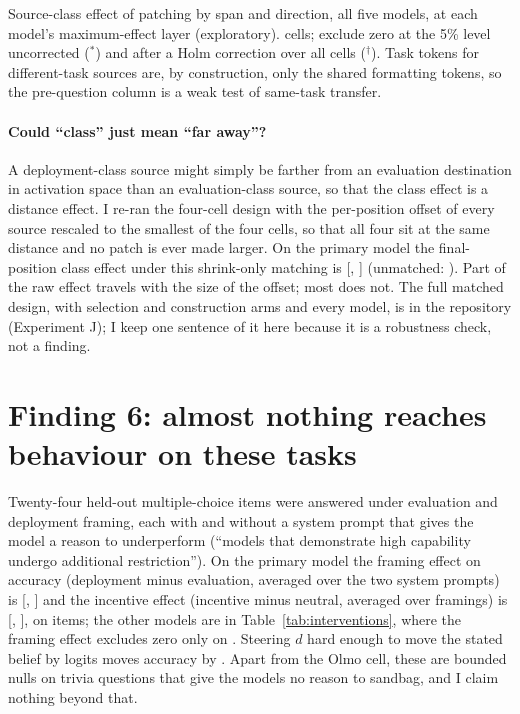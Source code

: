 \documentclass[10pt]{article}
\newcommand{\todo}[1]{\textcolor{red}{[TODO: #1]}}
\begin{document}
\begin{table}[t]\centering\footnotesize
\IfFileExists{tables/position_v2.tex}{}{\todo{run make\_paper\_assets\_v2}}
\caption{Source-class effect of patching by span and direction, all five
models, at each model's maximum-effect layer (exploratory). \VposCells{}
cells; \VposUncorrected{} exclude zero at the 5\% level uncorrected ($^{*}$)
and \VposHolm{} after a Holm correction over all cells ($^{\dagger}$). Task
tokens for different-task sources are, by construction, only the shared
formatting tokens, so the pre-question column is a weak test of same-task
transfer.}
\label{tab:position}
\end{table}

\paragraph{Could ``class'' just mean ``far away''?} A deployment-class
source might simply be farther from an evaluation destination in activation
space than an evaluation-class source, so that the class effect is a
distance effect. I re-ran the four-cell design with the per-position offset
of every source rescaled to the smallest of the four cells, so that all four
sit at the same distance and no patch is ever made larger. On the primary
model the final-position class effect under this shrink-only matching is
\NmatchConMinEvalFinal{} [\NmatchConMinEvalFinalLo{},
\NmatchConMinEvalFinalHi{}] (unmatched: \NmatchUnEvalFinal{}). Part of the raw
effect travels with the size of the offset; most does not. The full matched
design, with selection and construction arms and every model, is in the
repository (Experiment J); I keep one sentence of it here because it is a
robustness check, not a finding.

\section{Finding 6: almost nothing reaches behaviour on these tasks}\label{sec:behaviour}

Twenty-four held-out multiple-choice items were answered under evaluation and
deployment framing, each with and without a system prompt that gives the model
a reason to underperform (``models that demonstrate high capability undergo
additional restriction''). On the primary model the framing effect on
accuracy (deployment minus evaluation, averaged over the two system prompts)
is \NframingME{} [\NframingMELo{}, \NframingMEHi{}] and the incentive effect
(incentive minus neutral, averaged over framings) is \NincentiveME{}
[\NincentiveMELo{}, \NincentiveMEHi{}], on \NsandbagNitemsME{} items; the
other models are in Table~\ref{tab:interventions}, where the framing effect
excludes zero only on \VframingSigModels{}. Steering $d$ hard enough to move
the stated belief by \NswingDBelief{} logits moves accuracy by
\NswingDAcc{}. Apart from the Olmo cell, these are bounded nulls on trivia
questions that give the models no reason to sandbag, and I claim nothing
beyond that.
\end{document}
